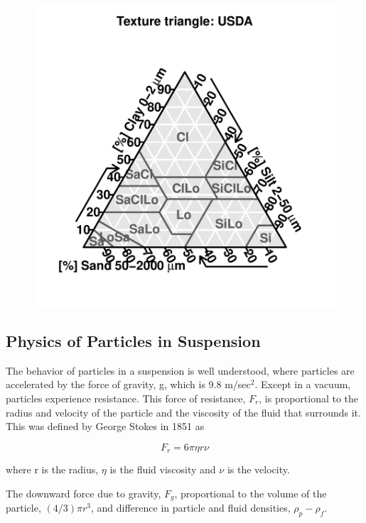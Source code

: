 \documentclass{tufte-handout}
\begin{document}
\begin{figure}
\includegraphics{Soil_Texture_Analysis_160528-USDATT}
\end{figure}

\subsection{Physics of Particles in Suspension}

The behavior of particles in a suspension is well understood, where particles are accelerated by the force of gravity, g, which is 9.8 m/sec$^2$. Except in a vacuum, particles experience resistance. This force of resistance, $F_r$, is proportional to the radius and velocity of the particle and the viscosity of the fluid that surrounds it. This was defined by George Stokes in 1851 as

\begin{equation}\label{eq:Fr}
F_r = 6\pi \eta r \nu
\end{equation}

\noindent where r is the radius, 
$\eta$ is the fluid viscosity and 
$\nu$ is the velocity.

The downward force due to gravity, $F_g$, proportional to the volume of the particle, $(4/3)\pi r^3$, and difference in particle and fluid densities, $\rho_p - \rho_f$.
\end{document}
